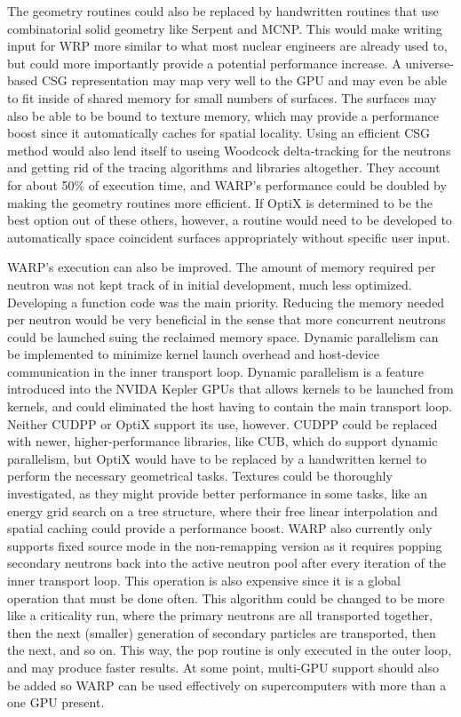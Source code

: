 The geometry routines could also be replaced by handwritten routines that use combinatorial solid geometry like Serpent and MCNP.  This would make writing input for WRP more similar to what most nuclear engineers are already used to, but could more importantly provide a potential performance increase.  A universe-based CSG representation may map very well to the GPU and may even be able to fit inside of shared memory for small numbers of surfaces.  The surfaces may also be able to be bound to texture memory, which may provide a performance boost since it automatically caches for spatial locality.  Using an efficient CSG method would also lend itself to useing Woodcock delta-tracking for the neutrons and getting rid of the tracing algorithms and libraries altogether.  They account for about 50\% of execution time, and WARP's performance could be doubled by making the geometry routines more efficient.  If OptiX is determined to be the best option out of these others, however, a routine would need to be developed to automatically space coincident surfaces appropriately without specific user input.

WARP's execution can also be improved.  The amount of memory required per neutron was not kept track of in initial development, much less optimized.  Developing a function code was the main priority.  Reducing the memory needed per neutron would be very beneficial in the sense that more concurrent neutrons could be launched suing the reclaimed memory space.  Dynamic parallelism can be implemented to minimize kernel launch overhead and host-device communication in the inner transport loop.  Dynamic parallelism is a feature introduced into the NVIDA Kepler GPUs that allows kernels to be launched from kernels, and could eliminated the host having to contain the main transport loop.  Neither CUDPP or OptiX support its use, however.  CUDPP could be replaced with newer, higher-performance libraries, like CUB, which do support dynamic parallelism, but OptiX would have to be replaced by a handwritten kernel to perform the necessary geometrical tasks.  Textures could be thoroughly investigated, as they might provide better performance in some tasks, like an energy grid search on a tree structure, where their free linear interpolation and spatial caching could provide a performance boost.  WARP also currently only supports fixed source mode in the non-remapping version as it requires popping secondary neutrons back into the active neutron pool after every iteration of the inner transport loop.  This operation is also expensive since it is a global operation that must be done often.  This algorithm could be changed to be more like a criticality run, where the primary neutrons are all transported together, then the next (smaller) generation of secondary particles are transported, then the next, and so on.  This way, the pop routine is only executed in the outer loop, and may produce faster results.   At some point, multi-GPU support should also be added so WARP can be used effectively on supercomputers with more than a one GPU present.

